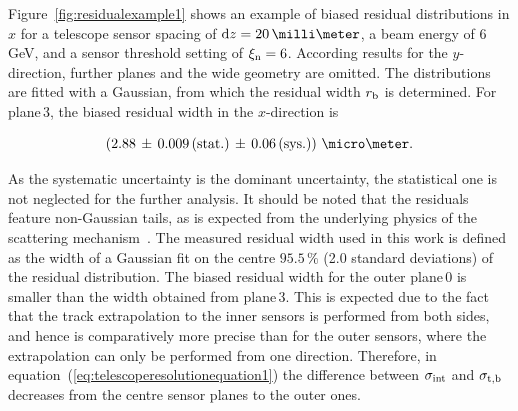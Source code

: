 Figure~\ref{fig:residualexample1} shows an example of biased residual distributions in $x$ for a telescope sensor spacing of $\dz = 20\,\milli\meter$,
 a beam energy of 6\,GeV, and a sensor threshold setting of $\xi_{\textrm{n}} = 6$. 
According results for the $y$-direction, further planes and the wide geometry are omitted. 
The distributions are fitted with a Gaussian, from which the residual width $r_{\textrm{b}}$ is determined. 
For plane\,3, the biased residual width in the $x$-direction is 

\begin{equation}
\left( 2.88\,\pm\, 0.009\,\textrm{(stat.)}\,\pm\, 0.06\, \textrm{(sys.)}\right)\,\micro\meter. 
\end{equation}

\noindent
As the systematic uncertainty is the dominant uncertainty, the statistical one is not neglected for the further analysis. 
It should be noted that the residuals feature non-Gaussian tails, as is expected from the underlying physics of the scattering mechanism~\cite{ref:PDG-2014}. 
The measured residual width used in this work is defined as the width of a Gaussian fit on the centre $95.5\,\%$ (2.0 standard deviations) of the residual distribution.
The biased residual width for the outer plane\,0 is smaller than the width obtained from plane\,3.
This is expected due to the fact that the track extrapolation to the inner sensors is performed from both sides, and hence is comparatively more precise than for the outer sensors,
 where the extrapolation can only be performed from one direction. 
Therefore, in equation~(\ref{eq:telescoperesolutionequation1}) the difference between $\sigma_{\textrm{int}}$ and $\sigma_{\textrm{t,b}}$ decreases from the centre sensor planes to the outer ones. 

% 

